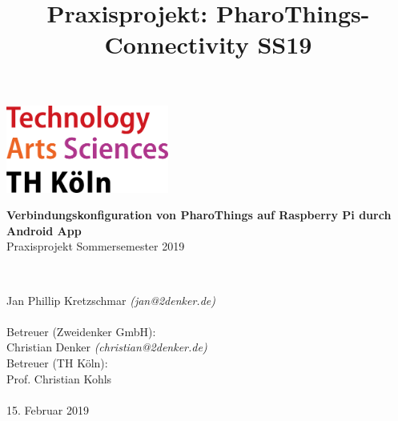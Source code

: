 \documentclass[12pt,a4paper]{article}
\title{Praxisprojekt: PharoThings-Connectivity SS19}
\begin{document}
	\begin{titlepage}
    \includegraphics[width=0.4\textwidth]{th_logo.png}
    ~\\[2.5cm]
    \begin{center}
    \textbf{\huge Verbindungskonfiguration von PharoThings auf Raspberry Pi durch Android App}\\[0.5cm]
    {\Large Praxisprojekt Sommersemester 2019}
    \vfill
    \end{center}
    ~\\[2.0cm]
    \begin{flushright}
    {\large Jan Phillip Kretzschmar \it{(jan@2denker.de)}}\\[0.1cm]
    ~\\[1.0cm]
    {\large Betreuer (Zweidenker GmbH):}\\[0.1cm]
    {\large Christian Denker \it{(christian@2denker.de)}}
    ~\\[0.5cm]
    {\large Betreuer (TH Köln):}\\[0.1cm]
    {\large Prof. Christian Kohls}\\[0.1cm]

	~\\[1.0cm]
    {\large 15. Februar 2019}
	\end{flushright}
    \end{titlepage}
    \tableofcontents
    \pagebreak
    
    
    
    
\end{document}

